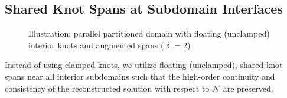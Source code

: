 \subsection{Shared Knot Spans at Subdomain Interfaces}


\begin{figure}[htbp]
	\centering
	\hfill
	\caption{Illustration:  parallel partitioned domain with floating (unclamped) interior knots and augmented spans ($\left| \delta \right|=2$)}
	\label{fig:DD-subdomain-illustration}
\end{figure}


Instead of using clamped knots, we utilize floating (unclamped), shared knot spans near all interior subdomains such that the high-order continuity and consistency of the reconstructed solution with respect to $\mathcal{N}$ are preserved. 

